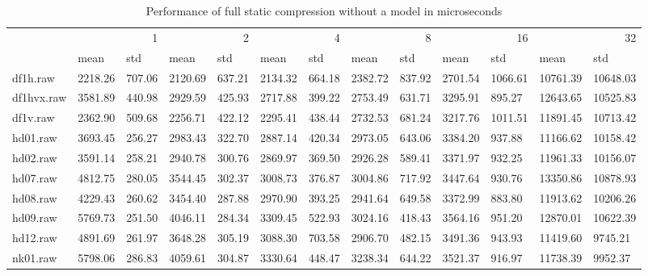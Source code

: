 \begin{table}
\caption{Performance of full static compression without a model in microseconds}
\begin{tabular}{lllllllllllll}
 & \multicolumn{2}{r}{1} & \multicolumn{2}{r}{2} & \multicolumn{2}{r}{4} & \multicolumn{2}{r}{8} & \multicolumn{2}{r}{16} & \multicolumn{2}{r}{32} \\
 & mean & std & mean & std & mean & std & mean & std & mean & std & mean & std \\
df1h.raw & 2218.26 & 707.06 & 2120.69 & 637.21 & 2134.32 & 664.18 & 2382.72 & 837.92 & 2701.54 & 1066.61 & 10761.39 & 10648.03 \\
df1hvx.raw & 3581.89 & 440.98 & 2929.59 & 425.93 & 2717.88 & 399.22 & 2753.49 & 631.71 & 3295.91 & 895.27 & 12643.65 & 10525.83 \\
df1v.raw & 2362.90 & 509.68 & 2256.71 & 422.12 & 2295.41 & 438.44 & 2732.53 & 681.24 & 3217.76 & 1011.51 & 11891.45 & 10713.42 \\
hd01.raw & 3693.45 & 256.27 & 2983.43 & 322.70 & 2887.14 & 420.34 & 2973.05 & 643.06 & 3384.20 & 937.88 & 11166.62 & 10158.42 \\
hd02.raw & 3591.14 & 258.21 & 2940.78 & 300.76 & 2869.97 & 369.50 & 2926.28 & 589.41 & 3371.97 & 932.25 & 11961.33 & 10156.07 \\
hd07.raw & 4812.75 & 280.05 & 3544.45 & 302.37 & 3008.73 & 376.87 & 3004.86 & 717.92 & 3447.64 & 930.76 & 13350.86 & 10878.93 \\
hd08.raw & 4229.43 & 260.62 & 3454.40 & 287.88 & 2970.90 & 393.25 & 2941.64 & 649.58 & 3372.99 & 883.80 & 11913.62 & 10206.26 \\
hd09.raw & 5769.73 & 251.50 & 4046.11 & 284.34 & 3309.45 & 522.93 & 3024.16 & 418.43 & 3564.16 & 951.20 & 12870.01 & 10622.39 \\
hd12.raw & 4891.69 & 261.97 & 3648.28 & 305.19 & 3088.30 & 703.58 & 2906.70 & 482.15 & 3491.36 & 943.93 & 11419.60 & 9745.21 \\
nk01.raw & 5798.06 & 286.83 & 4059.61 & 304.87 & 3330.64 & 448.47 & 3238.34 & 644.22 & 3521.37 & 916.97 & 11738.39 & 9952.37 \\
\end{tabular}
\end{table}
